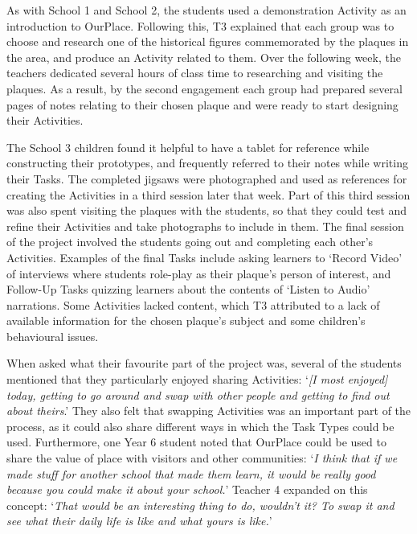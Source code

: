 As with School 1 and School 2, the students used a demonstration Activity as an introduction to OurPlace. Following this, T3 explained that each group was to choose and research one of the historical figures commemorated by the plaques in the area, and produce an Activity related to them. Over the following week, the teachers dedicated several hours of class time to researching and visiting the plaques. As a result, by the second engagement each group had prepared several pages of notes relating to their chosen plaque and were ready to start designing their Activities.

The School 3 children found it helpful to have a tablet for reference while constructing their prototypes, and frequently referred to their notes while writing their Tasks. The completed jigsaws were photographed and used as references for creating the Activities in a third session later that week. Part of this third session was also spent visiting the plaques with the students, so that they could test and refine their Activities and take photographs to include in them. The final session of the project involved the students going out and completing each other's Activities. Examples of the final Tasks include asking learners to `Record Video' of interviews where students role-play as their plaque's person of interest, and Follow-Up Tasks quizzing learners about the contents of `Listen to Audio' narrations. Some Activities lacked content, which T3 attributed to a lack of available information for the chosen plaque's subject and some children's behavioural issues.

When asked what their favourite part of the project was, several of the students mentioned that they particularly enjoyed sharing Activities: `\textit{[I most enjoyed] today, getting to go around and swap with other people and getting to find out about theirs}.' They also felt that swapping Activities was an important part of the process, as it could also share different ways in which the Task Types could be used. Furthermore, one Year 6 student noted that OurPlace could be used to share the value of place with visitors and other communities: `\textit{I think that if we made stuff for another school that made them learn, it would be really good because you could make it about your school.}' Teacher 4 expanded on this concept: `\textit{That would be an interesting thing to do, wouldn't it? To swap it and see what their daily life is like and what yours is like.}' 

